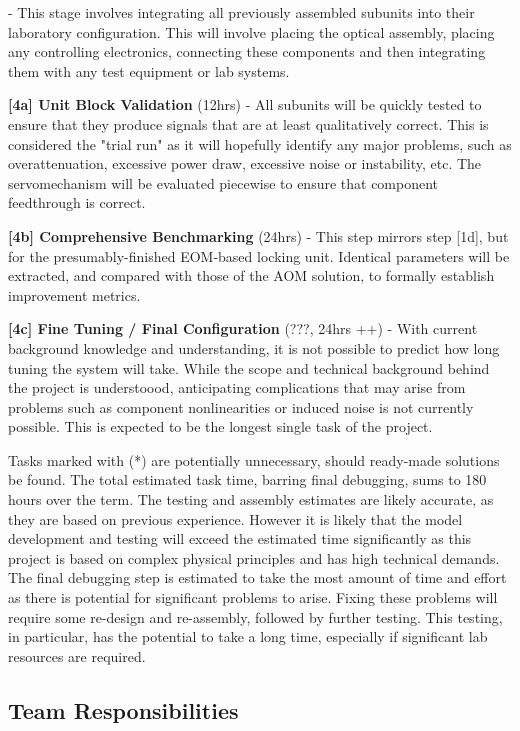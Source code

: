 \begin{packed_itemize}
  - This stage involves integrating all previously assembled subunits into their
  laboratory configuration. This will involve placing the optical assembly,
  placing any controlling electronics, connecting these components and then
  integrating them with any test equipment or lab systems.
  \item{\textbf{[4a] Unit Block Validation} (12hrs)}
  - All subunits will be quickly tested to ensure that they produce signals that
  are at least qualitatively correct. This is considered the "trial run" as it
  will hopefully identify any major problems, such as overattenuation,
  excessive power draw, excessive noise or instability, etc. The servomechanism
  will be evaluated piecewise to ensure that component feedthrough is correct.
  \item{\textbf{[4b] Comprehensive Benchmarking} (24hrs)}
  - This step mirrors step [1d], but for the presumably-finished EOM-based
  locking unit. Identical parameters will be extracted, and compared with
  those of the AOM solution, to formally establish improvement metrics.
  \item{\textbf{[4c] Fine Tuning / Final Configuration} (???, 24hrs ++)}
  - With current background knowledge and understanding, it is not possible
  to predict how long tuning the system will take. While the scope and
  technical background behind the project is understoood, anticipating
  complications that may arise from problems such as component nonlinearities or
  induced noise is not currently possible. This is expected to be the
  longest single task of the project.
\end{packed_itemize}

Tasks marked with (*) are potentially unnecessary, should ready-made solutions
be found. The total estimated task time, barring final debugging, sums to 180
hours over the term. The testing and assembly estimates are likely accurate, as
they are based on previous experience. However it is likely that the model
development and testing will exceed the estimated time significantly as this
project is based on complex physical principles and has high technical demands.
The final debugging step is estimated to take the most amount of time and effort
as there is potential for significant problems to arise. Fixing these problems
will require some re-design and re-assembly, followed by further testing. This
testing, in particular, has the potential to take a long time, especially if
significant lab resources are required.

\subsection{Team Responsibilities} %

